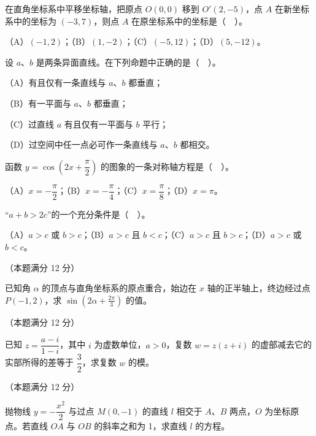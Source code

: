 \begin{question}
在直角坐标系中平移坐标轴，把原点 $O(0,0)$ 移到 $O'(2,-5)$，点 $A$ 在新坐标系中的坐标为 $(-3,7)$，则点 $A$ 在原坐标系中的坐标是（　）。

（A）$(-1,2)$；（B）$(1,-2)$；（C）$(-5,12)$；（D）$(5,-12)$。

\end{question}
\begin{question}
设 $a$、$b$ 是两条异面直线。在下列命题中正确的是（　）。

（A）有且仅有一条直线与 $a$、$b$ 都垂直；

（B）有一平面与 $a$、$b$ 都垂直；

（C）过直线 $a$ 有且仅有一平面与 $b$ 平行；

（D）过空间中任一点必可作一条直线与 $a$、$b$ 都相交。

\end{question}
\begin{question}
函数 $y=\cos\left(2x+\dfrac{\pi}{2}\right)$ 的图象的一条对称轴方程是（　）。

（A）$x=-\dfrac{\pi}{2}$；（B）$x=-\dfrac{\pi}{4}$；（C）$x=\dfrac{\pi}{8}$；（D）$x=\pi$。

\end{question}
\begin{question}
“$a+b>2c$”的一个充分条件是（　）。

（A）$a>c$ 或 $b>c$；（B）$a>c$ 且 $b<c$；（C）$a>c$ 且 $b>c$；（D）$a>c$ 或 $b<c$。

\end{question}

\begin{question}
（本题满分 12 分）

已知角 $\alpha$ 的顶点与直角坐标系的原点重合，始边在 $x$ 轴的正半轴上，终边经过点 $P(-1,2)$，求 $\sin\left(2\alpha+\frac{2\pi}{3}\right)$ 的值。

\end{question}
\begin{question}
（本题满分 12 分）

已知 $z=\dfrac{a-i}{1-i}$，其中 $i$ 为虚数单位，$a>0$，复数 $w=z(z+i)$ 的虚部减去它的实部所得的差等于 $\dfrac32$，求复数 $w$ 的模。

\end{question}
\begin{question}
（本题满分 12 分）

抛物线 $y=-\dfrac{x^2}{2}$ 与过点 $M(0,-1)$ 的直线 $l$ 相交于 $A$、$B$ 两点，$O$ 为坐标原点。若直线 $OA$ 与 $OB$ 的斜率之和为 1，求直线 $l$ 的方程。

\end{question}

